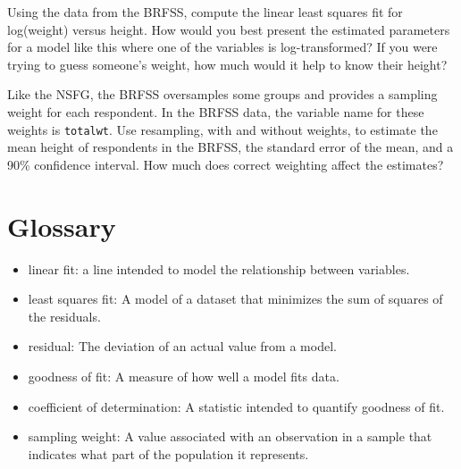 \documentclass[12pt]{book}
\begin{document}
\begin{exercise}

Using the data from the BRFSS, compute the linear least squares
fit for log(weight) versus height.
How would you best present the estimated parameters for a model
like this where one of the variables is log-transformed?
If you were trying to guess
someone's weight, how much would it help to know their height?

Like the NSFG, the BRFSS oversamples some groups and provides
a sampling weight for each respondent.  In the BRFSS data, the variable
name for these weights is {\tt totalwt}.
Use resampling, with and without weights, to estimate the mean height
of respondents in the BRFSS, the standard error of the mean, and a
90\% confidence interval.  How much does correct weighting affect the
estimates?
\end{exercise}


\section{Glossary}

\begin{itemize}

\item linear fit: a line intended to model the relationship between
variables.  

\item least squares fit: A model of a dataset that minimizes the
sum of squares of the residuals.

\item residual: The deviation of an actual value from a model.

\item goodness of fit: A measure of how well a model fits data.

\item coefficient of determination: A statistic intended to
quantify goodness of fit.

\item sampling weight: A value associated with an observation in a
  sample that indicates what part of the population it represents.

\end{itemize}
\end{document}
